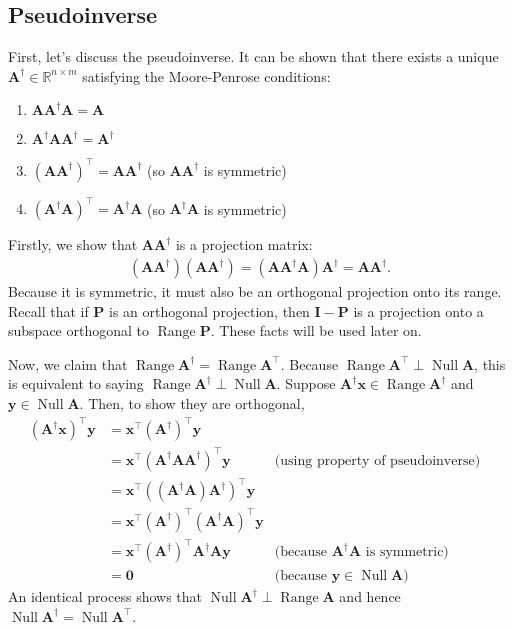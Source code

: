 \documentclass[12pt,a4paper]{article} %
\DeclareMathOperator{\Range}{Range}
\DeclareMathOperator{\Null}{Null}
\begin{document}
\subsection{Pseudoinverse}
First, let's discuss the pseudoinverse.
It can be shown that there exists a unique $\mathbf A^\dagger \in \mathbb R^{n \times m}$ satisfying the Moore-Penrose conditions:
\begin{enumerate}
    \item $\mathbf A \mathbf A^\dagger \mathbf A = \mathbf A$
    \item $\mathbf A^\dagger \mathbf A \mathbf A^\dagger = \mathbf A^\dagger$
    \item $(\mathbf A \mathbf A^\dagger)^\top = \mathbf A \mathbf A^\dagger$ (so $\mathbf A \mathbf A^\dagger$ is symmetric)
    \item $(\mathbf A^\dagger \mathbf A)^\top = \mathbf A^\dagger \mathbf A$ (so $\mathbf A^\dagger \mathbf A$ is symmetric)
\end{enumerate}
Firstly, we show that $\mathbf A \mathbf A^\dagger$ is a projection matrix:
\begin{align*}
    (\mathbf A \mathbf A^\dagger) (\mathbf A \mathbf A^\dagger) = (\mathbf A \mathbf A^\dagger \mathbf A) \mathbf A^\dagger = \mathbf A \mathbf A^\dagger.
\end{align*}
Because it is symmetric, it must also be an orthogonal projection onto its range.
Recall that if $\mathbf P$ is an orthogonal projection, then $\mathbf I - \mathbf P$ is a projection onto a 
subspace orthogonal to $\Range \mathbf P$. These facts will be used later on.

Now, we claim that $\Range \mathbf A^\dagger = \Range \mathbf A^\top$. Because $\Range \mathbf A^\top \perp \Null \mathbf A$, this is 
equivalent to saying $\Range \mathbf A^\dagger \perp \Null \mathbf A$. Suppose $\mathbf A^\dagger \bm x \in \Range \mathbf A^\dagger$ and $\bm y \in \Null \mathbf A$. Then,
to show they are orthogonal,
\begin{align*}
    (\mathbf A^\dagger \bm x)^\top \bm y &= \bm x^\top (\mathbf A^\dagger)^\top \bm y \\ 
    &= \bm x^\top (\mathbf A^\dagger \mathbf A\mathbf A^\dagger)^\top \bm y& \text{(using property of pseudoinverse)}&\\ 
    &= \bm x^\top ((\mathbf A^\dagger \mathbf A)\mathbf A^\dagger)^\top \bm y \\ 
    &= \bm x^\top (\mathbf A^\dagger)^\top (\mathbf A^\dagger\mathbf A)^\top \bm y \\ 
    &= \bm x^\top  (\mathbf A^\dagger)^\top \mathbf A^\dagger\mathbf A \bm y & \text{(because $\mathbf A^\dagger \mathbf A$ is symmetric)}\\ 
    &= \bm 0 & \text{(because $\bm y \in \Null \mathbf A$)}
\end{align*}
An identical process shows that $\Null \mathbf A^\dagger \perp \Range \mathbf A$ and hence
$\Null \mathbf A^\dagger = \Null \mathbf A^\top$.
\end{document}
